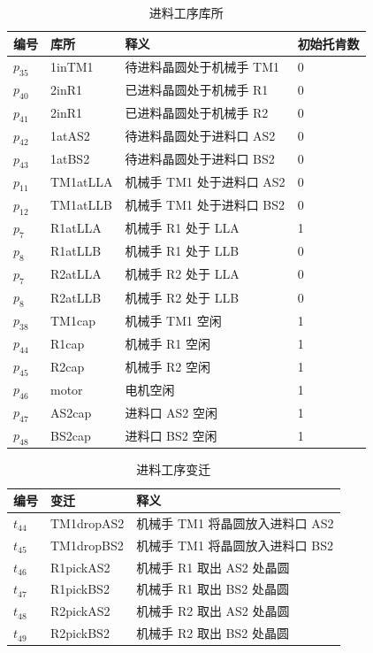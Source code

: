 \begin{table}[H]
	\centering
	\caption{进料工序库所}
	\begin{tabular}{llll}
		\toprule
		编号 & 库所     & 释义                      & 初始托肯数 \\
		\hline
		$p_{35}$  & 1inTM1   & 待进料晶圆处于机械手 TM1  & 0          \\
		$p_{40}$  & 2inR1    & 已进料晶圆处于机械手 R1   & 0          \\
		$p_{41}$  & 2inR1    & 已进料晶圆处于机械手 R2   & 0          \\
		$p_{42}$  & 1atAS2   & 待进料晶圆处于进料口 AS2  & 0          \\
		$p_{43}$  & 1atBS2   & 待进料晶圆处于进料口 BS2  & 0          \\
		$p_{11}$  & TM1atLLA & 机械手 TM1 处于进料口 AS2 & 0          \\
		$p_{12}$  & TM1atLLB & 机械手 TM1 处于进料口 BS2 & 0          \\
		$p_{7}$   & R1atLLA  & 机械手 R1 处于 LLA        & 1          \\
		$p_{8}$   & R1atLLB  & 机械手 R1 处于 LLB        & 0          \\
		$p_{7}$   & R2atLLA  & 机械手 R2 处于 LLA        & 0          \\
		$p_{8}$   & R2atLLB  & 机械手 R2 处于 LLB        & 0          \\
		$p_{38}$  & TM1cap   & 机械手 TM1 空闲           & 1          \\
		$p_{44}$  & R1cap    & 机械手 R1 空闲            & 1          \\
		$p_{45}$  & R2cap    & 机械手 R2 空闲            & 1          \\
		$p_{46}$  & motor    & 电机空闲                  & 1          \\
		$p_{47}$  & AS2cap   & 进料口 AS2 空闲           & 1          \\
		$p_{48}$  & BS2cap   & 进料口 BS2 空闲           & 1          \\
		\bottomrule
	\end{tabular}
\end{table}

\begin{table}[H]
	\centering
	\caption{进料工序变迁}
	\begin{tabular}{lll}
		\toprule
		编号 & 变迁       & 释义                            \\
		\hline
		$t_{44}$  & TM1dropAS2 & 机械手 TM1 将晶圆放入进料口 AS2 \\
		$t_{45}$  & TM1dropBS2 & 机械手 TM1 将晶圆放入进料口 BS2 \\
		$t_{46}$  & R1pickAS2  & 机械手 R1 取出 AS2 处晶圆       \\
		$t_{47}$  & R1pickBS2  & 机械手 R1 取出 BS2 处晶圆       \\
		$t_{48}$  & R2pickAS2  & 机械手 R2 取出 AS2 处晶圆       \\
		$t_{49}$  & R2pickBS2  & 机械手 R2 取出 BS2 处晶圆       \\
		\bottomrule
	\end{tabular}
\end{table}

